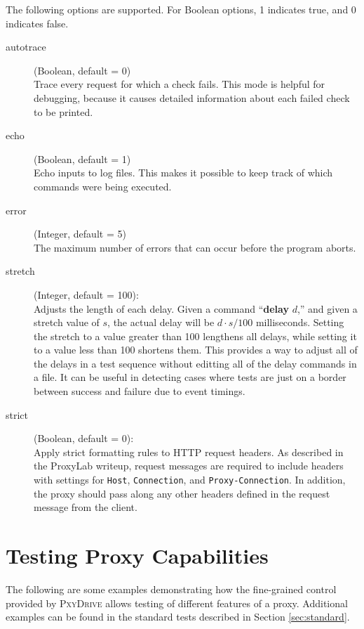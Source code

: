 \documentclass[11pt]{article}
\newcommand{\pxydrive}{\textsc{PxyDrive}}
\begin{document}
The following options are supported.  For Boolean options, 1
indicates true, and 0 indicates false.
\begin{description}
\item[autotrace] (Boolean, default = 0)\\
 Trace every request for which a check fails.
This mode is helpful for debugging,
because it causes detailed information about each failed check to be
printed.
\item[echo] (Boolean, default = 1)\\
Echo inputs to log files.  This makes it possible to keep track of which commands were being executed.
\item[error] (Integer, default = 5)\\
The maximum number of errors that can occur before the program aborts.
\item[stretch] (Integer, default = 100):\\
Adjusts the length of each
  delay.  Given a command ``\textbf{delay} $d$,'' and given a stretch
  value of $s$, the actual delay will be $d \cdot s/100$ milliseconds.
  Setting the stretch to a value greater than 100 lengthens all
  delays, while setting it to a value less than 100 shortens them.
  This provides a way to adjust all of the delays in a test sequence
  without editting all of the delay commands in a file.  It can be
  useful in detecting cases where tests are just on a border between
  success and failure due to event timings.
\item[strict] (Boolean, default = 0):\\ Apply strict formatting rules
  to HTTP request headers.  As described in the ProxyLab writeup,
  request messages are required to include headers with settings for
  \texttt{Host}, \texttt{Connection}, and \texttt{Proxy-Connection}.
  In addition, the proxy should pass along any other headers defined
  in the request message from the client.
\end{description}

\section{Testing Proxy Capabilities}
\label{sec:testing}

The following are some examples demonstrating how the fine-grained
control provided by \pxydrive{} allows testing of different features
of a proxy.  Additional examples can be found in the standard tests
described in Section \ref{sec:standard}.
\end{document}
